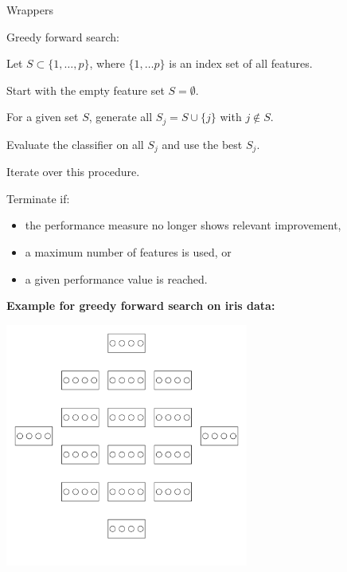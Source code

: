 \documentclass[11pt,compress,t,notes=noshow, xcolor=table]{beamer}
\begin{document}
\begin{vbframe}{Wrappers}
    \framebreak

    \begin{blocki}{Greedy forward search:}
      \item Let $S \subset \{1, \dots, p \}$, where $\{1, \dots p \}$ is an index set of all features.
      \item Start with the empty feature set $S = \emptyset$.
      \item For a given set $S$, generate all $S_j = S \cup \{j\}$ with $j \notin S$.
      \item Evaluate the classifier on all $S_j$ and use the best $S_j$.
      \item Iterate over this procedure.
      \item Terminate if:
        \begin{itemize}
          \item the performance measure no longer shows relevant improvement,
          \item a maximum number of features is used, or
          \item a given performance value is reached.
        \end{itemize}
    \end{blocki}

    \framebreak

    \textbf{Example for greedy forward search on iris data:}
    \begin{center}
    \includegraphics[width = 0.6\textwidth]{figure_man/wrapperanim1.png}
    \end{center}

    \framebreak


\end{vbframe}
\end{document}
